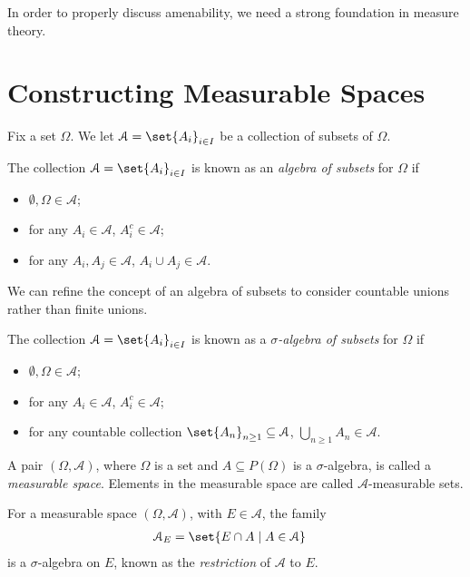 In order to properly discuss amenability, we need a strong foundation in measure theory.

\section{Constructing Measurable Spaces}%
Fix a set $\Omega$. We let $\mathcal{A} =\set{A_{i}}_{i\in I}$ be a collection of subsets of $\Omega$.
\begin{definition}
  The collection $\mathcal{A} = \set{A_i}_{i\in I}$ is known as an \textit{algebra of subsets} for $\Omega$ if
  \begin{itemize}
    \item $\emptyset,\Omega \in \mathcal{A}$;
    \item for any $A_i\in \mathcal{A}$, $A_i^{c}\in \mathcal{A}$;
    \item for any $A_i,A_j\in \mathcal{A}$, $A_i \cup A_j \in \mathcal{A}$.
  \end{itemize}
\end{definition}
We can refine the concept of an algebra of subsets to consider countable unions rather than finite unions.
\begin{definition}
  The collection $\mathcal{A} = \set{A_i}_{i\in I}$ is known as a \textit{$\sigma$-algebra of subsets} for $\Omega$ if
  \begin{itemize}
    \item $\emptyset,\Omega \in \mathcal{A}$;
    \item for any $A_i\in \mathcal{A}$, $A_i^{c}\in \mathcal{A}$;
    \item for any countable collection $\set{A_n}_{n\geq 1}\subseteq \mathcal{A}$, $\bigcup_{n\geq 1}A_{n} \in \mathcal{A}$.
  \end{itemize}
\end{definition}
\begin{definition}
A pair $\left(\Omega,\mathcal{A}\right)$, where $\Omega$ is a set and $A\subseteq P(\Omega)$ is a $\sigma$-algebra, is called a \textit{measurable space}. Elements in the measurable space are called $\mathcal{A}$-measurable sets.
\end{definition}
\begin{definition}
  For a measurable space $\left(\Omega,\mathcal{A}\right)$, with $E\in \mathcal{A}$, the family
  \begin{align*}
    \mathcal{A}_{E} &= \set{E\cap A\mid A\in \mathcal{A}}
  \end{align*}
  is a $\sigma$-algebra on $E$, known as the \textit{restriction} of $\mathcal{A}$ to $E$.
\end{definition}
